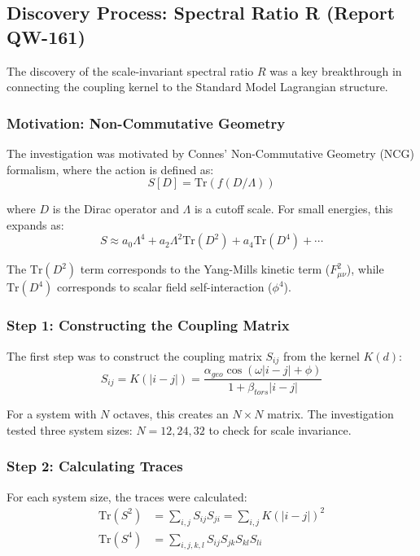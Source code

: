 \documentclass[11pt, a4paper]{article}
\begin{document}
\subsection{Discovery Process: Spectral Ratio R (Report QW-161)}

The discovery of the scale-invariant spectral ratio $R$ was a key breakthrough in connecting the coupling kernel to the Standard Model Lagrangian structure.

\subsubsection{Motivation: Non-Commutative Geometry}

The investigation was motivated by Connes' Non-Commutative Geometry (NCG) formalism, where the action is defined as:
\begin{equation}
S[D] = \text{Tr}(f(D/\Lambda))
\end{equation}

where $D$ is the Dirac operator and $\Lambda$ is a cutoff scale. For small energies, this expands as:
\begin{equation}
S \approx a_0\Lambda^4 + a_2\Lambda^2 \text{Tr}(D^2) + a_4 \text{Tr}(D^4) + \cdots
\end{equation}

The $\text{Tr}(D^2)$ term corresponds to the Yang-Mills kinetic term ($F_{\mu\nu}^2$), while $\text{Tr}(D^4)$ corresponds to scalar field self-interaction ($\phi^4$).

\subsubsection{Step 1: Constructing the Coupling Matrix}

The first step was to construct the coupling matrix $S_{ij}$ from the kernel $K(d)$:
\begin{equation}
S_{ij} = K(|i-j|) = \frac{\alpha_{geo} \cos(\omega|i-j| + \phi)}{1 + \beta_{tors}|i-j|}
\end{equation}

For a system with $N$ octaves, this creates an $N \times N$ matrix. The investigation tested three system sizes: $N = 12, 24, 32$ to check for scale invariance.

\subsubsection{Step 2: Calculating Traces}

For each system size, the traces were calculated:
\begin{align}
\text{Tr}(S^2) &= \sum_{i,j} S_{ij} S_{ji} = \sum_{i,j} K(|i-j|)^2\\
\text{Tr}(S^4) &= \sum_{i,j,k,l} S_{ij} S_{jk} S_{kl} S_{li}
\end{align}
\end{document}
